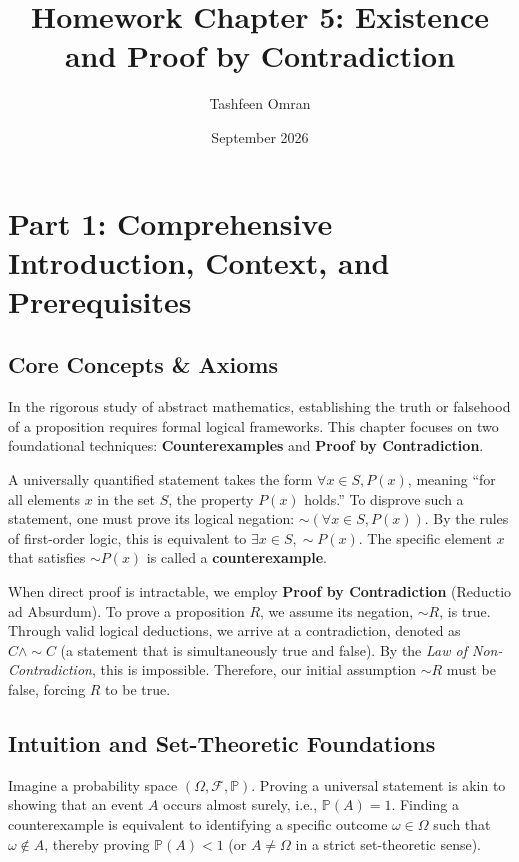 \documentclass[11pt, letterpaper]{article}
\title{\textbf{Homework Chapter 5: Existence and Proof by Contradiction}}
\author{Tashfeen Omran}
\date{September 2026}
\theoremstyle{remark}
\newcommand{\Prob}{\mathbb{P}}
\newcommand{\F}{\mathcal{F}}
\begin{document}
\maketitle
\tableofcontents
\newpage

\section{Part 1: Comprehensive Introduction, Context, and Prerequisites}

\subsection{Core Concepts \& Axioms}
In the rigorous study of abstract mathematics, establishing the truth or falsehood of a proposition requires formal logical frameworks. This chapter focuses on two foundational techniques: \textbf{Counterexamples} and \textbf{Proof by Contradiction}. 

A universally quantified statement takes the form $\forall x \in S, P(x)$, meaning ``for all elements $x$ in the set $S$, the property $P(x)$ holds.'' To disprove such a statement, one must prove its logical negation: $\sim (\forall x \in S, P(x))$. By the rules of first-order logic, this is equivalent to $\exists x \in S, \sim P(x)$. The specific element $x$ that satisfies $\sim P(x)$ is called a \textbf{counterexample}.

When direct proof is intractable, we employ \textbf{Proof by Contradiction} (Reductio ad Absurdum). To prove a proposition $R$, we assume its negation, $\sim R$, is true. Through valid logical deductions, we arrive at a contradiction, denoted as $C \land \sim C$ (a statement that is simultaneously true and false). By the \textit{Law of Non-Contradiction}, this is impossible. Therefore, our initial assumption $\sim R$ must be false, forcing $R$ to be true.

\subsection{Intuition and Set-Theoretic Foundations}
Imagine a probability space $(\Omega, \F, \Prob)$. Proving a universal statement is akin to showing that an event $A$ occurs almost surely, i.e., $\Prob(A) = 1$. Finding a counterexample is equivalent to identifying a specific outcome $\omega \in \Omega$ such that $\omega \notin A$, thereby proving $\Prob(A) < 1$ (or $A \neq \Omega$ in a strict set-theoretic sense). 
\end{document}
